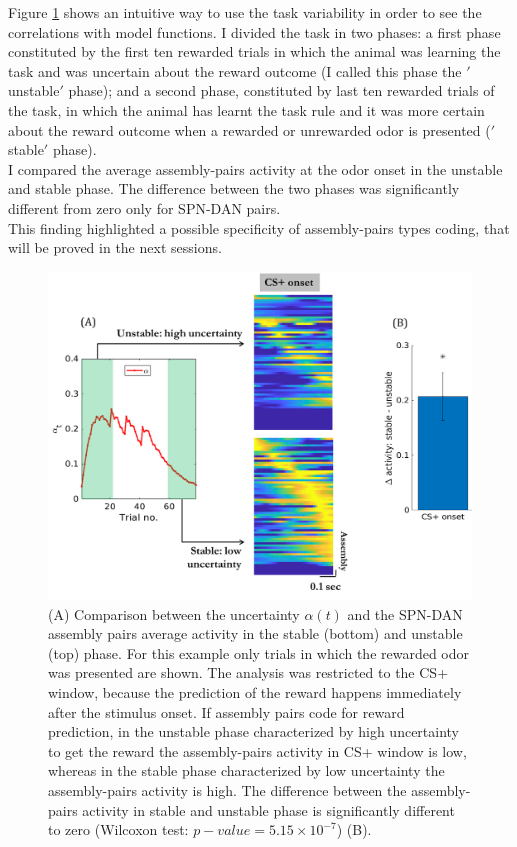 Figure \ref{fig:StableUnstableAlphaCS} shows an intuitive way to use the task variability in order to see the correlations with model functions. I divided the task in two phases: a first phase constituted by the first ten rewarded trials in which the animal was learning the task and was uncertain about the reward outcome (I called this phase the $'$unstable$'$ phase); and a second phase, constituted by last ten rewarded trials of the task, in which the animal has learnt the task rule and it was more certain about the reward outcome when a rewarded or unrewarded odor is presented ($'$stable$'$ phase).\\I compared the average assembly-pairs activity at the odor onset in the unstable and stable phase. The difference between the two phases was significantly different from zero only for SPN-DAN pairs.\\This finding highlighted a possible specificity of assembly-pairs types coding, that will be proved in the next sessions.
\begin{figure}[H]
    \centering
 \includegraphics[scale=0.65]{figures/PreRegress.png}
 \caption{(A) Comparison between the uncertainty $\alpha(t)$ and the SPN-DAN assembly pairs average activity in the stable (bottom) and unstable (top) phase. For this example only trials in which the rewarded odor was presented are shown. The analysis was restricted to the CS+ window, because the prediction of the reward happens immediately after the stimulus onset. If assembly pairs code for reward prediction, in the unstable phase characterized by high uncertainty to get the reward the assembly-pairs activity in CS+ window is low, whereas in the stable phase characterized by low uncertainty the assembly-pairs activity is high. The difference between the assembly-pairs activity in stable and unstable phase is significantly different to zero (Wilcoxon test: $p-value = 5.15\times10^{-7}$) (B). }
\label{fig:StableUnstableAlphaCS}
\end{figure}
